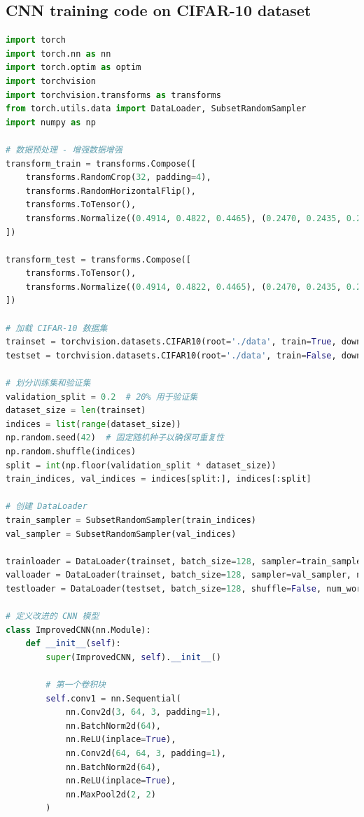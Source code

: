 \documentclass[UTF8]{report}
\theoremstyle{MyLineTheoremStyle} %
\theoremstyle{MyBlockTheoremStyle} %
\theoremstyle{MySubsubsectionStyle} %
\begin{document}
\subsection{CNN training code on CIFAR-10 dataset}
\begin{lstlisting}[language=python, caption={神经网络CNN训练（纯手写）}, label={lst:cnn_train_handwritten}]
import torch
import torch.nn as nn
import torch.optim as optim
import torchvision
import torchvision.transforms as transforms
from torch.utils.data import DataLoader, SubsetRandomSampler
import numpy as np

# 数据预处理 - 增强数据增强
transform_train = transforms.Compose([
    transforms.RandomCrop(32, padding=4),
    transforms.RandomHorizontalFlip(),
    transforms.ToTensor(),
    transforms.Normalize((0.4914, 0.4822, 0.4465), (0.2470, 0.2435, 0.2616))
])

transform_test = transforms.Compose([
    transforms.ToTensor(),
    transforms.Normalize((0.4914, 0.4822, 0.4465), (0.2470, 0.2435, 0.2616))
])

# 加载 CIFAR-10 数据集
trainset = torchvision.datasets.CIFAR10(root='./data', train=True, download=True, transform=transform_train)
testset = torchvision.datasets.CIFAR10(root='./data', train=False, download=True, transform=transform_test)

# 划分训练集和验证集
validation_split = 0.2  # 20% 用于验证集
dataset_size = len(trainset)
indices = list(range(dataset_size))
np.random.seed(42)  # 固定随机种子以确保可重复性
np.random.shuffle(indices)
split = int(np.floor(validation_split * dataset_size))
train_indices, val_indices = indices[split:], indices[:split]

# 创建 DataLoader
train_sampler = SubsetRandomSampler(train_indices)
val_sampler = SubsetRandomSampler(val_indices)

trainloader = DataLoader(trainset, batch_size=128, sampler=train_sampler, num_workers=2)
valloader = DataLoader(trainset, batch_size=128, sampler=val_sampler, num_workers=2)
testloader = DataLoader(testset, batch_size=128, shuffle=False, num_workers=2)

# 定义改进的 CNN 模型
class ImprovedCNN(nn.Module):
    def __init__(self):
        super(ImprovedCNN, self).__init__()
        
        # 第一个卷积块
        self.conv1 = nn.Sequential(
            nn.Conv2d(3, 64, 3, padding=1),
            nn.BatchNorm2d(64),
            nn.ReLU(inplace=True),
            nn.Conv2d(64, 64, 3, padding=1),
            nn.BatchNorm2d(64),
            nn.ReLU(inplace=True),
            nn.MaxPool2d(2, 2)
        )
        

\end{lstlisting}
\end{document}
